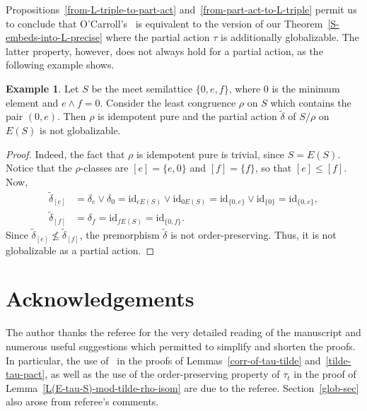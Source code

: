 \documentclass[reqno]{amsart}
\theoremstyle{definition}
\newtheorem{exm}[thrm]{Example}
\newcommand{\id}{\mathrm{id}}
\newcommand{\0}{\theta}
\newcommand{\dt}{\delta}
\newcommand{\tl}{\tilde}
\newcommand{\mt}{\wedge}
\newcommand{\jn}{\vee}
\begin{document}
Propositions~\ref{from-L-triple-to-part-act} and~\ref{from-part-act-to-L-triple} permit us to conclude that O'Carroll's~\cite[Theorem 4]{O'Carroll77} is equivalent to the version of our Theorem~\ref{S-embeds-into-L-precise} where the partial action $\tau$ is additionally globalizable. The latter property, however, does not always hold for a partial action, as the following example shows.
\begin{exm}\label{non-global-tl-dt}
	Let $S$ be the meet semilattice $\{0,e,f\}$, where $0$ is the minimum element and $e\mt f=0$. Consider the least congruence $\rho$ on $S$ which contains the pair $(0,e)$. Then $\rho$ is idempotent pure and the partial action $\tl\dt$ of $S/\rho$ on $E(S)$  is not globalizable.
\end{exm}
\begin{proof}
	Indeed, the fact that $\rho$ is idempotent pure is trivial, since $S=E(S)$. Notice that the $\rho$-classes are $[e]=\{e,0\}$ and $[f]=\{f\}$, so that $[e]\le[f]$. Now,
	\begin{align*}
	\tl\dt_{[e]}&=\dt_e\jn\dt_0=\id_{eE(S)}\jn\id_{0E(S)}=\id_{\{0,e\}}\jn\id_{\{0\}}=\id_{\{0,e\}},\\
	\tl\dt_{[f]}&=\dt_f=\id_{fE(S)}=\id_{\{0,f\}}.
	\end{align*}
	Since $\tl\dt_{[e]}\not\le\tl\dt_{[f]}$, the premorphism $\tl\dt$ is not order-preserving. Thus, it is not globalizable as a partial action.
\end{proof}

\section*{Acknowledgements}
	The author thanks the referee for the very detailed reading of the manuscript and numerous useful suggestions which permitted to simplify and shorten the proofs. In particular, the use of~\cite[Proposition 1.2.1]{Lawson} in the proofs of Lemmas~\ref{corr-of-tau-tilde} and~\ref{tilde-tau-pact}, as well as the use of the order-preserving property of $\tau_t$ in the proof of Lemma~\ref{L(E-tau-S)-mod-tilde-rho-isom} are due to the referee. Section~\ref{glob-sec} also arose from referee's comments.

	{}
	
\end{document}
